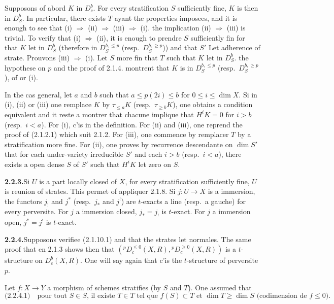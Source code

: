 \documentclass[12pt,a4paper]{article}
\theoremstyle{plain}
\theoremstyle{definition}
\begin{document}
Supposons of abord $K$ in $D_c^b$. For every stratification $S$ sufficiently fine, $K$ is then in $D_S^b$. In particular, there exists $T$ ayant the properties imposees, and it is enough to see that (i) $\Rightarrow$ (ii) $\Rightarrow$ (iii) $\Rightarrow$ (i). the implication (ii) $\Rightarrow$ (iii) is trivial. To verify that (i) $\Rightarrow$ (ii), it is enough to prendre $S$ sufficiently fin for that $K$ let in $D_S^b$ (therefore in $D_S^{b, \leqslant p}$ (resp.\ $D_S^{b, \geqslant p}$)) and that $S'$ Let adherence of strate. Prouvons (iii) $\Rightarrow$ (i). Let $S$ more fin that $T$ such that $K$ let in $D_S^b$. the hypothese on $p$ and the proof of 2.1.4. montrent that $K$ is in $D_S^{b, \leqslant p}$ (resp.\ $D_S^{b, \geqslant p}$), of or (i).

In the cas general, let $a$ and $b$ such that $a \leqslant p(2i) \leqslant b$ for $0 \leqslant i \leqslant \dim X$. Si in (i), (ii) or (iii) one remplace $K$ by $\tau_{\leqslant a} K$ (resp.\ $\tau_{\geqslant b} K$), one obtains a condition equivalent and it reste a montrer that chacune implique that $H^i K = 0$ for $i > b$ (resp.\ $i < a$). For (i), c'is in the definition. For (ii) and (iii), one reprend the proof of (2.1.2.1) which suit 2.1.2. For (iii), one commence by remplacer $T$ by a stratification more fine. For (ii), one proves by recurrence descendante on $\dim S'$ that for each under-variety irreducible $S'$ and each $i > b$ (resp.\ $i < a$), there exists a open dense $S$ of $S'$ such that $H^i K$ let zero on $S$.

\smallskip
\noindent\textbf{2.2.3.}\quad Si $U$ is a part locally closed of $X$, for every stratification sufficiently fine, $U$ is reunion of strates. This permet of appliquer 2.1.8. Si $j : U \to X$ is a immersion, the functors $j_!$ and $j^*$ (resp.\ $j_*$ and $j^!$) are $t$-exacts a line (resp.\ a gauche) for every perversite. For $j$ a immersion closed, $j_* = j_!$ is $t$-exact. For $j$ a immersion open, $j^* = j^!$ is $t$-exact.

\smallskip
\noindent\textbf{2.2.4.}\quad Supposons verifiee (2.1.10.1) and that the strates let normales. The same proof that en 2.1.3 shows then that $({}^p D_c^{\leqslant 0}(X, R), {}^p D_c^{\geqslant 0}(X, R))$ is a $t$-structure on $D_c^b(X, R)$. One will say again that c'is the $t$-structure of perversite $p$.

Let $f : X \to Y$ a morphism of schemes stratifies (by $S$ and $T$). One assumed that
\[
\text{(2.2.4.1)}\quad\text{pour tout } S \in S\text{, il existe } T \in T\text{ tel que } f(S) \subset T\text{ et } \dim T \geqslant \dim S\text{ (codimension de }f \leqslant 0\text{).}
\]
\end{document}
